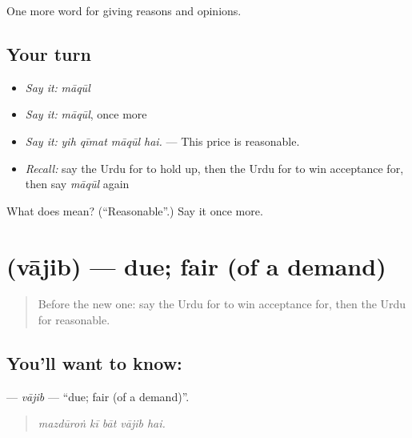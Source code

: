 \begin{grammarlens}[title={What you've built}]
One more word for giving reasons and opinions.
\end{grammarlens}

\subsection*{Your turn}
\begin{itemize}
\raggedright
  \item \emph{Say it:} \emph{māqūl}
  \item \emph{Say it:} \emph{māqūl}, once more
  \item \emph{Say it:} \emph{yih qīmat māqūl hai.} — This price is reasonable.
  \item \emph{Recall:} say the Urdu for to hold up, then the Urdu for to win acceptance for, then say \emph{māqūl} again
\end{itemize}

\begin{tcolorbox}[breakable,colback=teal!4,colframe=teal!35!black,title={Before you move on}]
What does  mean? (\textquotedblleft{}Reasonable\textquotedblright{}.) Say it once more.
\end{tcolorbox}
\section[\texorpdfstring{\ur{واجب} (vājib)}{واجب (vājib)}]{ (vājib) — due; fair (of a demand)}

\label{lesson:UR-C354-vajib}



\begin{quote}
Before the new one: say the Urdu for to win acceptance for, then the Urdu for reasonable.
\end{quote}

\subsection*{You'll want to know: }
\textbf{} — \emph{vājib} — \textquotedblleft{}due; fair (of a demand)\textquotedblright{}.

\begin{quote}
    
\end{quote}

\begin{quote}
\emph{mazdūroṅ kī bāt vājib hai.}
\end{quote}

